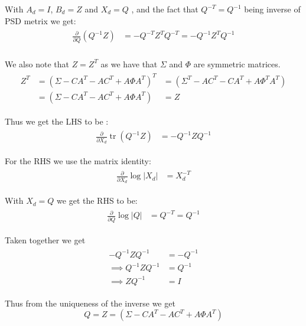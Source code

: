 \documentclass{tufte-handout}
\begin{document}
\begin{enumerate}[(a)]
    With $A_d = I$, $B_d = Z$ and $X_d = Q$ , and the fact that $Q^{-T} = Q^{-1}$ being inverse of PSD metrix we get:
   \begin{multline} 
    \begin{aligned}
        \frac{\partial}{\partial Q} (Q^{-1}Z) &= -Q^{-T}Z^T Q^{-T}  = - Q^{-1} Z^T Q^{-1}\\
    \end{aligned}
   \end{multline}

   We also note that $Z = Z^T$  as we have that $\Sigma$ and $\Phi$ are symmetric matrices.
   \begin{multline}
    \begin{aligned}
        Z^T &= (\Sigma - CA^T - AC^T + A \Phi A^T )^T &=  (\Sigma^T  - AC^T - C A^T  + A \Phi^T A^T)\\
        & = (\Sigma - CA^T - AC^T + A \Phi A^T ) &= Z 
    \end{aligned} 
 \end{multline}

Thus we get the LHS to be :
    \begin{multline}
        \begin{aligned}
            \frac{\partial}{\partial X_d} \operatorname{tr}(Q^{-1}Z) &= -Q^{-1} Z Q^{-1} 
        \end{aligned}
    \end{multline} 

For the RHS we use the matrix identity:
\begin{multline}
    \begin{aligned}
        \frac{\partial}{\partial X_d} \log |X_d| &= X_d^{-T}
    \end{aligned}
\end{multline}

With $X_d = Q$ we get the RHS to be:
\begin{multline}
    \begin{aligned}
        \frac{\partial}{\partial Q} \log |Q| &= Q^{-T} = Q^{-1}
    \end{aligned}
\end{multline}

Taken together we get 
\begin{multline}
    \begin{aligned}
    -Q^{-1} Z Q^{-1} &= -Q^{-1} \\
    \implies Q^{-1} Z Q^{-1} &= Q^{-1}  \\
    \implies Z Q^{-1} &= I 
    \end{aligned}
\end{multline}


Thus from the uniqueness of the inverse we get  
\begin{equation}
    Q = Z = (\Sigma - CA^T - AC^T + A \Phi A^T)
\end{equation}

\end{enumerate}



\end{document}

